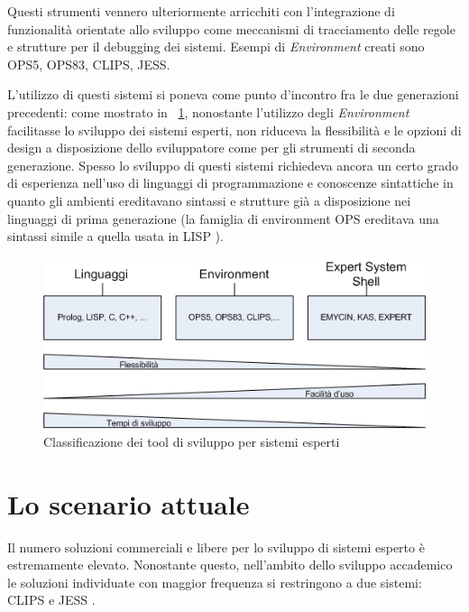 Questi strumenti vennero ulteriormente arricchiti con l'integrazione di funzionalità orientate allo sviluppo come meccanismi di tracciamento delle regole e strutture per il debugging dei sistemi. Esempi di \emph{Environment} creati sono OPS5, OPS83, CLIPS, JESS.

L'utilizzo di questi sistemi si poneva come punto d'incontro fra le due generazioni precedenti: come mostrato in \figurename~\ref{fig:classificazione-tools}, nonostante l'utilizzo degli \emph{Environment} facilitasse lo sviluppo dei sistemi esperti, non riduceva la flessibilità e le opzioni di design a disposizione dello sviluppatore come per gli strumenti di seconda generazione. Spesso lo sviluppo di questi sistemi richiedeva ancora un certo grado di esperienza nell'uso di linguaggi di programmazione e conoscenze sintattiche in quanto gli ambienti ereditavano sintassi e strutture già a disposizione nei linguaggi di prima generazione (la famiglia di environment OPS ereditava una sintassi simile a quella usata in LISP \cite{brownston1985}).

\begin{figure}
\centering
\includegraphics[scale=0.7]{Immagini/Capitolo1/classificazione-strumenti.png}
\caption{Classificazione dei tool di sviluppo per sistemi esperti}\label{fig:classificazione-tools}
\end{figure}


\section{Lo scenario attuale}
Il numero soluzioni commerciali e libere per lo sviluppo di sistemi esperto è estremamente elevato. Nonostante questo, nell'ambito dello sviluppo accademico le soluzioni individuate con maggior frequenza si restringono a due sistemi: CLIPS e JESS \cite{laerhoven1999}.

